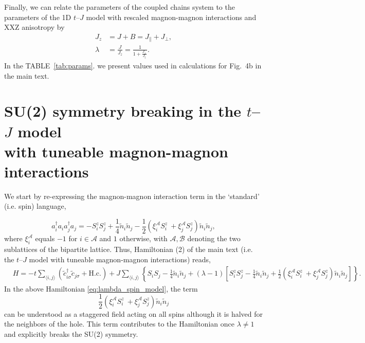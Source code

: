 \documentclass[%
 reprint,
 amsmath,amssymb,
 aps, onecolumn,
prl,
]{revtex4-1}
\newcommand{\mean}[1]{\langle#1\rangle}
\begin{document}
Finally, we can relate the parameters of the coupled chains system to the parameters of the 1D $t$--$J$ model with rescaled magnon-magnon interactions and XXZ anisotropy by 
%
\begin{align}
	J_z &= J + B = J_\parallel + J_\perp, \\
	\lambda &= \frac{J}{J_z} = \frac{1}{1 + \frac{J_\perp}{J_\parallel}}.
\end{align}
%
In the TABLE~\ref{tab:params}. we present values used in calculations for Fig.~4b in the main text.

\section{SU(2) symmetry breaking in the $t$--$J$ model \\ with tuneable magnon-magnon interactions}

We start by re-expressing the magnon-magnon interaction term in the `standard' (i.e. spin) language,

\begin{equation}
    a_i^\dag a_i a_j^\dag a_j = -S_i^z S_j^z + \frac{1}{4}\tilde{n}_i\tilde{n}_j - \frac{1}{2}\left(\xi_i^\mathcal{A} S_i^z \ + \xi_j^\mathcal{A} S_j^z \right)\tilde{n}_i\tilde{n}_j,
\end{equation}
%
where $\xi_i^\mathcal{A}$ equals $-1$ for $i\in\mathcal{A}$ and $1$ otherwise, with $\mathcal{A},\mathcal{B}$ denoting the two sublattices of the bipartite lattice. Thus, Hamiltonian (2) of the main text (i.e. the $t$--$J$ model with tuneable magnon-magnon interactions) reads,
%
\begin{equation}
        \begin{aligned}
    	&H = -t\sum_{\mean{i,j}}\left(\tilde{c}_{i\sigma}^\dagger\tilde{c}_{j\sigma} + \text{H.c.}\right)
	+ J\sum_{\mean{i,j}}\left\{S_i S_j - \frac{1}{4}\tilde{n}_i\tilde{n}_j 
	+ \left(\lambda-1\right) \left[S_i^z S_j^z - \frac{1}{4}\tilde{n}_i\tilde{n}_j + \frac{1}{2}\left(\xi_i^\mathcal{A} S_i^z \ + \xi_j^\mathcal{A} S_j^z \right)\tilde{n}_i\tilde{n}_j\right] \right\}.
	\end{aligned}
	\label{eq:lambda_spin_model}
\end{equation}
In the above Hamiltonian \eqref{eq:lambda_spin_model}, the term
%
\begin{equation}
    \frac{1}{2}\left(\xi_i^\mathcal{A} S_i^z \ + \xi_j^\mathcal{A} S_j^z \right)\tilde{n}_i\tilde{n}_j
        \label{eq:staggered_term}
\end{equation}
%
can be understood as a staggered field acting on all spins although it is halved for the neighbors of the hole. This term contributes to the Hamiltonian once $\lambda \neq 1$ and explicitly breaks the SU(2) symmetry.  
\\
\end{document}
